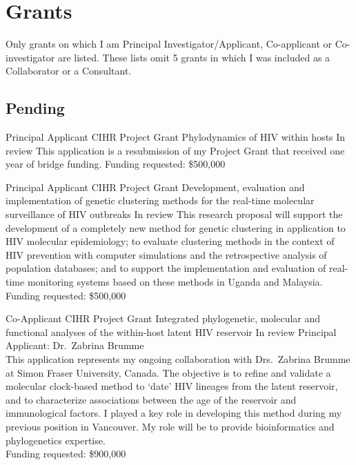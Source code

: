 \documentclass[11pt]{moderncv}
\begin{document}
\vspace{1em}

\vspace{1em}



\section{Grants}

Only grants on which I am Principal Investigator/Applicant, Co-applicant or Co-investigator are listed.
These lists omit 5 grants in which I was included as a Collaborator or a Consultant.\\


\subsection {Pending}

{Principal Applicant}
{CIHR Project Grant}
{Phylodynamics of HIV within hosts}
{In review}
{
This application is a resubmission of my Project Grant that received one year of bridge funding. 
Funding requested: \$500,000
}

{Principal Applicant}
{CIHR Project Grant}
{Development, evaluation and implementation of genetic clustering methods for the real-time molecular surveillance of HIV outbreaks}
{In review}
{
This research proposal will support the development of a completely new method for genetic clustering in application to HIV molecular epidemiology; 
to evaluate clustering methods in the context of HIV prevention with computer simulations and the retrospective analysis of population databases; 
and to support the implementation and evaluation of real-time monitoring systems based on these methods in Uganda and Malaysia.\\
Funding requested: \$500,000
}

{Co-Applicant}
{CIHR Project Grant}
{Integrated phylogenetic, molecular and functional analyses of the within-host latent HIV reservoir}
{In review}
{
Principal Applicant: Dr.~Zabrina Brumme\\
This application represents my ongoing collaboration with Drs.~Zabrina Brumme at Simon Fraser University, Canada. 
The objective is to refine and validate a molecular clock-based method to `date' HIV lineages from the latent reservoir, and to characterize associations between the age of the reservoir and immunological factors.
I played a key role in developing this method during my previous position in Vancouver.
My role will be to provide bioinformatics and phylogenetics expertise.\\
Funding requested: \$900,000
}
\end{document}
